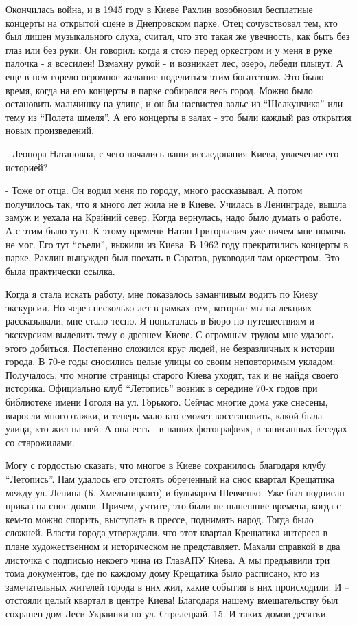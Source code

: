 Окончилась война, и в 1945 году в Киеве Рахлин возобновил бесплатные концерты
на открытой сцене в Днепровском парке. Отец сочувствовал тем, кто был лишен
музыкального слуха, считал, что это такая же увечность, как быть без глаз или
без руки. Он говорил: когда я стою перед оркестром и у меня в руке палочка - я
всесилен! Взмахну рукой - и возникает лес, озеро, лебеди плывут. А еще в нем
горело огромное желание поделиться этим богатством. Это было время, когда на
его концерты в парке собирался весь город. Можно было остановить мальчишку на
улице, и он бы насвистел вальс из “Щелкунчика” или тему из “Полета шмеля”. А
его концерты в залах - это были каждый раз открытия новых произведений. 

- Леонора Натановна, с чего начались ваши исследования Киева, увлечение его
историей?

- Тоже от отца. Он водил меня по городу, много рассказывал. А потом получилось
так, что я много лет жила не в Киеве. Училась в Ленинграде, вышла замуж и
уехала на Крайний север. Когда вернулась, надо было думать о работе. А с этим
было туго. К этому времени Натан Григорьевич уже ничем мне помочь не мог. Его
тут “съели”, выжили из Киева. В 1962 году прекратились концерты в парке. Рахлин
вынужден был поехать в Саратов, руководил там оркестром. Это была практически
ссылка. 

Когда я стала искать работу, мне показалось заманчивым водить по Киеву
экскурсии. Но через несколько лет в рамках тем, которые мы на лекциях
рассказывали, мне стало тесно. Я попыталась в Бюро по путешествиям и экскурсиям
выделить тему о древнем Киеве. С огромным трудом мне удалось этого добиться.
Постепенно сложился круг людей, не безразличных к истории города. В 70-е годы
сносились целые улицы со своим неповторимым укладом. Получалось, что многие
страницы старого Киева уходят, так и не найдя своего историка. Официально клуб
“Летопись” возник в середине 70-х годов при библиотеке имени Гоголя на ул.
Горького. Сейчас многие дома уже снесены, выросли многоэтажки, и теперь мало
кто сможет восстановить, какой была улица, кто жил на ней. А она есть - в наших
фотографиях, в записанных беседах со старожилами. 

Могу с гордостью сказать, что многое в Киеве сохранилось благодаря клубу
“Летопись”. Нам удалось его отстоять обреченный на снос квартал Крещатика между
ул. Ленина (Б. Хмельницкого) и бульваром Шевченко. Уже был подписан приказ на
снос домов. Причем, учтите, это были не нынешние времена, когда с кем-то можно
спорить, выступать в прессе, поднимать народ. Тогда было сложней. Власти города
утверждали, что этот квартал Крещатика интереса в плане художественном и
историческом не представляет. Махали справкой в два листочка с подписью некоего
чина из ГлавАПУ Киева. А мы предъявили три тома документов, где по каждому дому
Крещатика было расписано, кто из замечательных жителей города в них жил, какие
события в них происходили. И – отстояли целый квартал в центре Киева! Благодаря
нашему вмешательству был сохранен дом Леси Украинки по ул. Стрелецкой, 15. И
таких домов десятки. 

